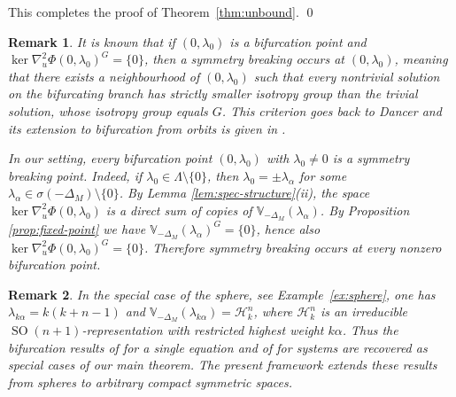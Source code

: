 \documentclass[reqno,twoside,12pt]{amsart}
\newtheorem{Remark}{Remark}[section]
\newcommand{\bV}{\mathbb{V}}
\newcommand{\cH}{\mathcal{H}}
\numberwithin{equation}{section} \errorcontextlines=0
\newcommand{\SO}{\operatorname{SO}}
\begin{document}
This completes the proof of Theorem~\ref{thm:unbound}.
\qed


\begin{Remark}\label{rem:sym-break}
It is known that if $(0,\lambda_0)$ is a bifurcation point and $\ker\nabla_u^2\Phi(0,\lambda_0)^G=\{0\}$, then a symmetry breaking occurs at $(0,\lambda_0)$, meaning that there exists a neighbourhood of $(0,\lambda_0)$ such that every nontrivial solution on the bifurcating branch has strictly smaller isotropy group than the trivial solution, whose isotropy group equals $G$. This criterion goes back to Dancer \cite{Dancer} and its extension to bifurcation from orbits is given in \cite[Lemma 3.11]{GKS2018}.

In our setting, every bifurcation point $(0,\lambda_0)$ with $\lambda_0\neq 0$ is a symmetry breaking point. Indeed, if $\lambda_0\in\Lambda\setminus\{0\}$, then $\lambda_0=\pm\lambda_\alpha$ for some $\lambda_\alpha\in\sigma(-\Delta_M)\setminus\{0\}$. By Lemma \ref{lem:spec-structure}\textup{(ii)}, the space $\ker\nabla_u^2\Phi(0,\lambda_0)$ is a direct sum of copies of $\bV_{-\Delta_M}(\lambda_\alpha)$. By Proposition \ref{prop:fixed-point} we have $\bV_{-\Delta_M}(\lambda_\alpha)^G=\{0\}$, hence also $\ker\nabla_u^2\Phi(0,\lambda_0)^G=\{0\}$. Therefore symmetry breaking occurs at every nonzero bifurcation point.
\end{Remark}



\begin{Remark}
In the special case of the sphere, see Example~\ref{ex:sphere}, one has $\lambda_{k\alpha}=k(k+n-1)$ and $\bV_{-\Delta_M}(\lambda_{k\alpha})=\cH_k^n$, where $\cH_k^n$ is an irreducible $\SO(n+1)$-representation with restricted highest weight $k\alpha$. Thus the bifurcation results of \cite{RybickiLB} for a single equation and of \cite{RybSte2015} for systems are recovered as special cases of our main theorem. The present framework extends these results from spheres to arbitrary compact symmetric spaces.
\end{Remark}
\end{document}
